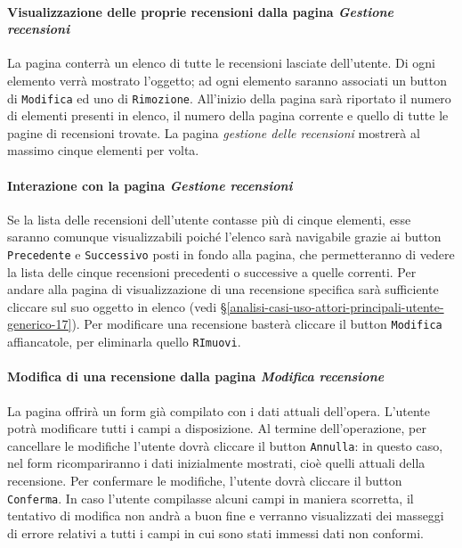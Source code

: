 \paragraph{Visualizzazione delle proprie recensioni dalla pagina \textit{Gestione recensioni}}
\label{analisi-casi-uso-attori-principali-utente-autenticato-5}
La pagina conterrà un elenco di tutte le recensioni lasciate dell'utente. Di ogni elemento verrà mostrato l'oggetto; ad ogni elemento saranno associati un button di \texttt{Modifica} ed uno di \texttt{Rimozione}. All'inizio della pagina sarà riportato il numero di elementi presenti in elenco, il numero della pagina corrente e quello di tutte le pagine di recensioni trovate. La pagina \textit{gestione delle recensioni} mostrerà al massimo cinque elementi per volta.


\paragraph{Interazione con la pagina \textit{Gestione recensioni}}
\label{analisi-casi-uso-attori-principali-utente-autenticato-6}
Se la lista delle recensioni dell'utente contasse più di cinque elementi, esse saranno comunque visualizzabili poiché l'elenco sarà navigabile grazie ai button \texttt{Precedente} e \texttt{Successivo} posti in fondo alla pagina, che permetteranno di vedere la lista delle cinque recensioni precedenti o successive a quelle correnti. Per andare alla pagina di visualizzazione di una recensione specifica sarà sufficiente cliccare sul suo oggetto in elenco (vedi §\ref{analisi-casi-uso-attori-principali-utente-generico-17}). Per modificare una recensione basterà cliccare il button \texttt{Modifica} affiancatole, per eliminarla quello \texttt{RImuovi}.


\paragraph{Modifica di una recensione dalla pagina \textit{Modifica recensione}}
\label{analisi-casi-uso-attori-principali-utente-autenticato-7}
La pagina offrirà un form già compilato con i dati attuali dell'opera. L'utente potrà modificare tutti i campi a disposizione. Al termine dell'operazione, per cancellare le modifiche l'utente dovrà cliccare il button \texttt{Annulla}: in questo caso, nel form ricompariranno i dati inizialmente mostrati, cioè quelli attuali della recensione. Per confermare le modifiche, l'utente dovrà cliccare il button \texttt{Conferma}. In caso l'utente compilasse alcuni campi in maniera scorretta, il tentativo di modifica non andrà a buon fine e verranno visualizzati dei masseggi di errore relativi a tutti i campi in cui sono stati immessi dati non conformi.


